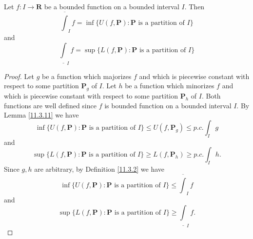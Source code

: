 \begin{proposition}\label{11.3.12}
    Let \(f : I \to \mathbf{R}\) be a bounded function on a bounded interval \(I\).
    Then
    \[
        \overline{\int}_I f = \inf\{U(f, \mathbf{P}) : \mathbf{P} \text{ is a partition of } I\}
    \]
    and
    \[
        \underline{\int}_I f = \sup\{L(f, \mathbf{P}) : \mathbf{P} \text{ is a partition of } I\}
    \]
\end{proposition}

\begin{proof}
    Let \(g\) be a function which majorizes \(f\) and which is piecewise constant with respect to some partition \(\mathbf{P}_g\) of \(I\).
    Let \(h\) be a function which minorizes \(f\) and which is piecewise constant with respect to some partition \(\mathbf{P}_h\) of \(I\).
    Both functions are well defined since \(f\) is bounded function on a bounded interval \(I\).
    By Lemma \ref{11.3.11} we have
    \[
        \inf \big\{U(f, \mathbf{P}) : \mathbf{P} \text{ is a partition of } I\big\} \leq U(f, \mathbf{P}_g) \leq p.c. \int_I g
    \]
    and
    \[
        \sup \big\{L(f, \mathbf{P}) : \mathbf{P} \text{ is a partition of } I\big\} \geq L(f, \mathbf{P}_h) \geq p.c. \int_I h.
    \]
    Since \(g, h\) are arbitrary, by Definition \ref{11.3.2} we have
    \[
        \inf \big\{U(f, \mathbf{P}) : \mathbf{P} \text{ is a partition of } I\big\} \leq \overline{\int}_I f
    \]
    and
    \[
        \sup \big\{L(f, \mathbf{P}) : \mathbf{P} \text{ is a partition of } I\big\} \geq \underline{\int}_I f.
    \]


\end{proof}
